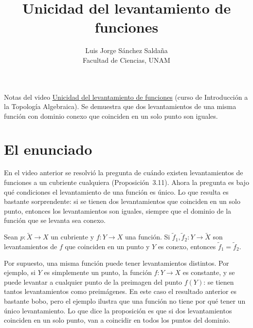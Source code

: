 \documentclass[11pt]{article}
\title{Unicidad del levantamiento de funciones}
\author{Luis Jorge Sánchez Saldaña\\[2pt]\small Facultad de Ciencias, UNAM}
\date{}
\begin{document}
\maketitle

\noindent\small Notas del video
\href{https://www.youtube.com/watch?v=1WN_9xHtM9I}{\guillemotleft{}Unicidad del levantamiento de funciones\guillemotright{}}
(curso de Introducción a la Topología Algebraica). Se demuestra que dos levantamientos de una misma función con dominio conexo que coinciden en un solo punto son iguales.
\normalsize

\section*{El enunciado}

En el video anterior se resolvió la pregunta de cuándo existen levantamientos de funciones a un cubriente cualquiera (Proposición~3.11). Ahora la pregunta es bajo qué condiciones el levantamiento de una función es único. Lo que resulta es bastante sorprendente: si se tienen dos levantamientos que coinciden en un solo punto, entonces los levantamientos son iguales, siempre que el dominio de la función que se levanta sea conexo.

\begin{prop}\label{prop:unicidad}
Sean $p\colon\tilde X\to X$ un cubriente y $f\colon Y\to X$ una función. Si $\tilde f_1,\tilde f_2\colon Y\to\tilde X$ son levantamientos de $f$ que coinciden en un punto y $Y$ es conexo, entonces $\tilde f_1=\tilde f_2$.
\end{prop}

Por supuesto, una misma función puede tener levantamientos distintos. Por ejemplo, si $Y$ es simplemente un punto, la función $f\colon Y\to X$ es constante, y se puede levantar a cualquier punto de la preimagen del punto $f(Y)$: se tienen tantos levantamientos como preimágenes. En este caso el resultado anterior es bastante bobo, pero el ejemplo ilustra que una función no tiene por qué tener un único levantamiento. Lo que dice la proposición es que si dos levantamientos coinciden en un solo punto, van a coincidir en todos los puntos del dominio.

\begin{center}
\end{center}
\end{document}
